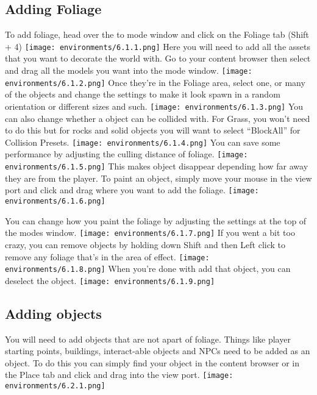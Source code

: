 \documentclass[../main.tex]{subfiles}
\begin{document}
\subsection{Adding Foliage}
To add foliage, head over the to mode window and click on the Foliage tab (Shift + 4)
\texttt{[image: environments/6.1.1.png]}
Here you will need to add all the assets that you want to decorate the world with.
Go to your content browser then select and drag all the models you want into the mode window.
\texttt{[image: environments/6.1.2.png]}
Once they’re in the Foliage area, select one, or many of the objects and change the settings to make it look spawn in a random orientation or different sizes and such.
\texttt{[image: environments/6.1.3.png]}
You can also change whether a object can be collided with. For Grass, you won’t need to do this but for rocks and solid objects you will want to select “BlockAll” for Collision Presets. 
\texttt{[image: environments/6.1.4.png]}
You can save some performance by adjusting the culling distance of foliage.
\texttt{[image: environments/6.1.5.png]}
This makes object disappear depending how far away they are from the player.
To paint an object, simply move your mouse in the view port and click and drag where you want to add the foliage.
\texttt{[image: environments/6.1.6.png]}

You can change how you paint the foliage by adjusting the settings at the top of the modes window.
\texttt{[image: environments/6.1.7.png]}
If you went a bit too crazy, you can remove objects by holding down Shift and then Left click to remove any foliage that’s in the area of effect.
\texttt{[image: environments/6.1.8.png]}
When you’re done with add that object, you can deselect the object.
\texttt{[image: environments/6.1.9.png]}

\subsection{Adding objects}
You will need to add objects that are not apart of foliage. Things like player starting points, buildings, interact-able objects and NPCs need to be added as an object.
To do this you can simply find your object in the content browser or in the Place tab and click and drag into the view port.
\texttt{[image: environments/6.2.1.png]}
\end{document}
